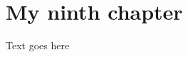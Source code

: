 \chapter{My ninth chapter}

\ifpdf
    \graphicspath{{Chapter3/Figs/Raster/}{Chapter3/Figs/PDF/}{Chapter3/Figs/}}
\else
    \graphicspath{{Chapter3/Figs/Vector/}{Chapter3/Figs/}}
\fi

Text goes here
